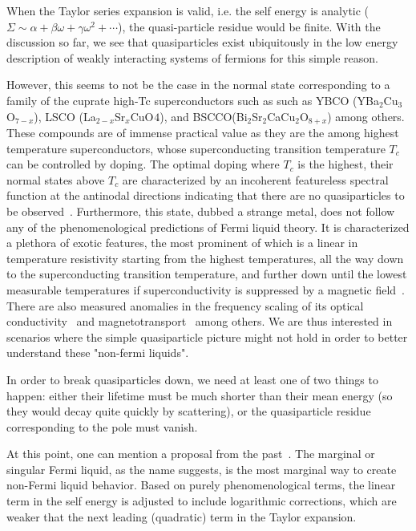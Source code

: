 \par
When the Taylor series expansion is valid, i.e. the self energy is analytic ($\Sigma \sim \alpha + \beta\omega + \gamma\omega^2 + \cdots$), the quasi-particle residue would be finite. With the discussion so far, we see that quasiparticles exist ubiquitously in the low energy description of weakly interacting systems of fermions for this simple reason. 
\par 
However, this seems to not be the case in the normal state corresponding to a family of the cuprate high-Tc superconductors such as such as YBCO (YBa${}_2$Cu${}_3$O${}_{7-x}$), LSCO (La${}_{2-x}$Sr${}_x$CuO$_{}4$), and BSCCO(Bi${}_2$Sr${}_2$CaCu${}_2$O${}_{8+x}$) among others. These compounds are of immense practical value as they are the among highest temperature superconductors, whose superconducting transition temperature $T_c$ can be controlled by doping. The optimal doping where $T_c$ is the highest, their normal states above $T_c$ are characterized by an incoherent featureless spectral function at the antinodal directions indicating that there are no quasiparticles to be observed~\cite{keimer2015quantum,damascelli2003angle}. Furthermore, this state, dubbed a strange metal, does not follow any of the phenomenological predictions of Fermi liquid theory. It is characterized a plethora of exotic features, the most prominent of which is a linear in temperature resistivity starting from the highest temperatures, all the way down to the superconducting transition temperature, and further down until the lowest measurable temperatures if superconductivity is suppressed by a magnetic field~\cite{Zaanen2019}. There are also measured anomalies in the frequency scaling of its optical conductivity~\cite{marel2003quantum,michon2023reconciling} and magnetotransport~\cite{hussey2008phenomenology,ayres2021incoherent} among others. We are thus interested in scenarios where the simple quasiparticle picture might not hold in order to better understand these "non-fermi liquids". 
\par
In order to break quasiparticles down, we need at least one of two things to happen: either their lifetime must be much shorter than their mean energy (so they would decay quite quickly by scattering), or the quasiparticle residue corresponding to the pole must vanish. 
\par
At this point, one can mention a proposal from the past~\cite{varma1989phenomenology,ruckenstein1991theory,varma1993towards,varma2002singular}. The marginal or singular Fermi liquid, as the name suggests, is the most marginal way to create non-Fermi liquid behavior. Based on purely phenomenological terms, the linear term in the self energy is adjusted to include logarithmic corrections, which are weaker that the next leading (quadratic) term in the Taylor expansion. 
\par

